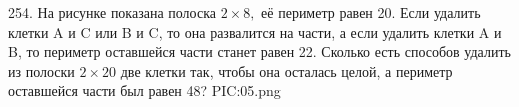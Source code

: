 254. На рисунке показана полоска $2\times 8,$ её периметр равен 20. Если удалить клетки A и C или B и C, то она развалится на части, а если удалить клетки A и B, то периметр оставшейся части станет равен 22. Сколько есть способов удалить из полоски $2\times 20$ две клетки так, чтобы она осталась целой, а периметр оставшейся части был равен 48?
{{PIC:05.png}}\\
